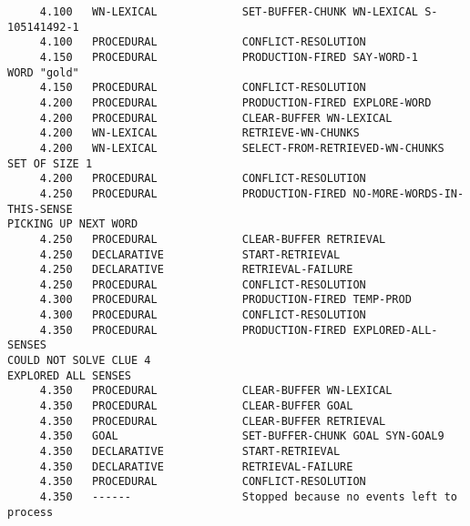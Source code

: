\begin{verbatim}
     4.100   WN-LEXICAL             SET-BUFFER-CHUNK WN-LEXICAL S-105141492-1 
     4.100   PROCEDURAL             CONFLICT-RESOLUTION 
     4.150   PROCEDURAL             PRODUCTION-FIRED SAY-WORD-1 
WORD "gold" 
     4.150   PROCEDURAL             CONFLICT-RESOLUTION 
     4.200   PROCEDURAL             PRODUCTION-FIRED EXPLORE-WORD 
     4.200   PROCEDURAL             CLEAR-BUFFER WN-LEXICAL 
     4.200   WN-LEXICAL             RETRIEVE-WN-CHUNKS 
     4.200   WN-LEXICAL             SELECT-FROM-RETRIEVED-WN-CHUNKS SET OF SIZE 1 
     4.200   PROCEDURAL             CONFLICT-RESOLUTION 
     4.250   PROCEDURAL             PRODUCTION-FIRED NO-MORE-WORDS-IN-THIS-SENSE 
PICKING UP NEXT WORD 
     4.250   PROCEDURAL             CLEAR-BUFFER RETRIEVAL 
     4.250   DECLARATIVE            START-RETRIEVAL 
     4.250   DECLARATIVE            RETRIEVAL-FAILURE 
     4.250   PROCEDURAL             CONFLICT-RESOLUTION 
     4.300   PROCEDURAL             PRODUCTION-FIRED TEMP-PROD 
     4.300   PROCEDURAL             CONFLICT-RESOLUTION 
     4.350   PROCEDURAL             PRODUCTION-FIRED EXPLORED-ALL-SENSES 
COULD NOT SOLVE CLUE 4 
EXPLORED ALL SENSES 
     4.350   PROCEDURAL             CLEAR-BUFFER WN-LEXICAL 
     4.350   PROCEDURAL             CLEAR-BUFFER GOAL 
     4.350   PROCEDURAL             CLEAR-BUFFER RETRIEVAL 
     4.350   GOAL                   SET-BUFFER-CHUNK GOAL SYN-GOAL9 
     4.350   DECLARATIVE            START-RETRIEVAL 
     4.350   DECLARATIVE            RETRIEVAL-FAILURE 
     4.350   PROCEDURAL             CONFLICT-RESOLUTION 
     4.350   ------                 Stopped because no events left to process 
\end{verbatim}

